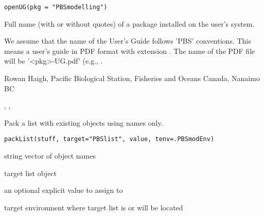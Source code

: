 \documentclass[letterpaper]{book}
\begin{document}
%
\begin{Usage}
\begin{verbatim}
openUG(pkg = "PBSmodelling")
\end{verbatim}
\end{Usage}
%
\begin{Arguments}
\begin{ldescription}
\item[\code{pkg}] Full name (with or without quotes) of a package installed on the user's system.
\end{ldescription}
\end{Arguments}
%
\begin{Details}\relax
We assume that the name of the User's Guide follows 'PBS' conventions.
This means a user's guide in PDF format with extension .
The name of the PDF file will be '<pkg>-UG.pdf' (e.g., .
\end{Details}
%
\begin{Author}\relax
Rowan Haigh, Pacific Biological Station, Fisheries and Oceans Canada, Nanaimo BC
\end{Author}
%
\begin{SeeAlso}\relax
{}, , 
\end{SeeAlso}
%
\begin{Description}\relax
Pack a list with existing objects using names only.
\end{Description}
%
\begin{Usage}
\begin{verbatim}
packList(stuff, target="PBSlist", value, tenv=.PBSmodEnv)
\end{verbatim}
\end{Usage}
%
\begin{Arguments}
\begin{ldescription}
\item[\code{stuff}]  string vector of object names 
\item[\code{target}]  target list object 
\item[\code{value}]  an optional explicit value to assign to  
\item[\code{tenv}]  target environment where target list is or will be located 
\end{ldescription}
\end{Arguments}
\end{document}
